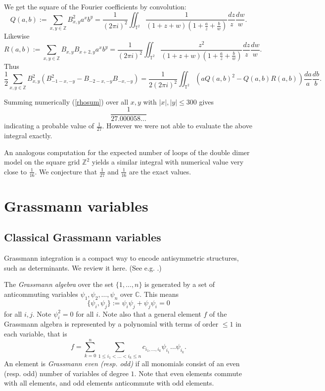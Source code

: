 \documentclass[12pt, reqno]{amsart}
\theoremstyle{definition}
\newcommand{\Z}{\mathbb{Z}}%
\newcommand{\T}{\mathbb{T}}%
\begin{document}
We get the square of the Fourier coefficients by convolution: 
$$
Q(a,b) := \sum_{x,y\in\Z}B_{x,y}^2a^xb^y= \frac1{(2\pi i)^2}\iint_{\T^2}\frac1{(1+z+w)(1+\frac{a}{z}+\frac{b}{w})}\frac{dz}{z}\frac{dw}{w}.
$$ 
Likewise  
$$
R(a,b) := \sum_{x,y\in\Z}B_{x,y}B_{x+2,y}a^xb^y= \frac1{(2\pi i)^2}\iint_{\T^2}\frac{z^2}{(1+z+w)(1+\frac{a}{z}+\frac{b}{w})}\frac{dz}{z}\frac{dw}{w}.
$$ 
Thus  
$$
\frac12\sum_{x,y\in\Z}B_{x,y}^2(B_{-1-x,-y}^2-B_{-2-x,-y}B_{-x,-y})=\frac1{2(2\pi i)^2}\iint_{\T^2} (aQ(a,b)^2-Q(a,b)R(a,b))\frac{da}{a}\frac{db}{b}.
$$

Summing numerically (\ref{rhosum}) over all $x,y$ with  $|x|,|y|\leq300$ gives 
$$ 
\frac{1}{27.000058...}
$$ 
indicating a probable value of $\frac{1}{27}$. However we were not able to evaluate the above integral exactly.

An analogous computation for the expected number of loops of the double dimer model on the  square grid $\Z^2$ yields a similar integral with numerical value very close to $\frac{1}{16}$. We conjecture that $\frac{1}{27}$ and $\frac{1}{16}$ are the exact values.
\appendix

\section{Grassmann variables}\label{sec:qgrassmann}  

\subsection{Classical Grassmann variables}\label{ssec:reviewofgrassmannvariables}

Grassmann integration is a compact way to encode antisymmetric structures, such as determinants. We review it here.   (See e.g. \cite{bigYellowCFT1997}.)

The \emph{Grassmann algebra} over the set $\{1,\dots,n\}$ is generated by a set of anticommuting variables $\psi_1, \psi_2, \dots, \psi_n$ over $\mathbb{C}$. This means
$$
\{ \psi_i, \psi_j \}
:=
\psi_i \psi_j + \psi_j \psi_i = 0
$$ 
for all  $i,j$.  Note  $\psi_i^2 = 0$ for all  $i$. Note also that a general element $f$ of the Grassmann algebra is represented by a polynomial with terms of order $\leq 1$ in each variable, that is
$$
f=\sum_{k=0}^{n} \sum_{1 \leq i_1 < \dots < i_k \leq n} c_{i_1,\dots,i_k} \psi_{i_1} \dots \psi_{i_k}.
$$
An element is \emph{Grassmann even (resp. odd)} if all monomials consist of an even (resp. odd) number of variables of degree $1$.  Note that even elements commute with all elements, and odd elements anticommute with odd elements.  
\end{document}
